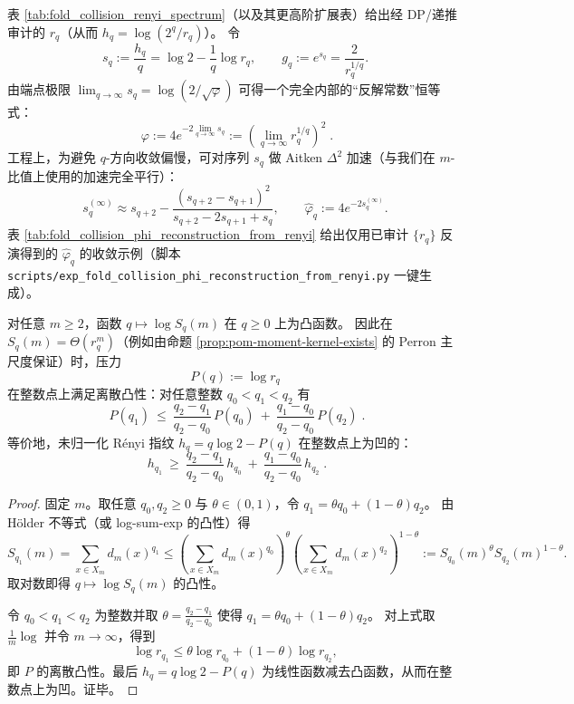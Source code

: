 \begin{remark}\label{rem:pom-recover-phi-from-collision-spectrum}
表 \ref{tab:fold_collision_renyi_spectrum}（以及其更高阶扩展表）给出经 DP/递推审计的 \(r_q\)（从而 \(h_q=\log(2^q/r_q)\)）。
令
\[
s_q:=\frac{h_q}{q}=\log 2-\frac{1}{q}\log r_q,
\qquad
g_q:=e^{s_q}=\frac{2}{r_q^{1/q}}.
\]
由端点极限 \(\lim_{q\to\infty}s_q=\log(2/\sqrt{\varphi})\) 可得一个完全内部的“反解常数”恒等式：
\[
\boxed{\;
\varphi
:=4e^{-2\lim_{q\to\infty}s_q}
:=\left(\lim_{q\to\infty}r_q^{1/q}\right)^2\; }.
\]
工程上，为避免 \(q\)-方向收敛偏慢，可对序列 \(s_q\) 做 Aitken \(\Delta^2\) 加速（与我们在 \(m\)-比值上使用的加速完全平行）：
\[
s_q^{(\infty)}
\approx
s_{q+2}-\frac{(s_{q+2}-s_{q+1})^2}{s_{q+2}-2s_{q+1}+s_q},
\qquad
\widehat\varphi_q:=4e^{-2s_q^{(\infty)}}.
\]
表 \ref{tab:fold_collision_phi_reconstruction_from_renyi} 给出仅用已审计 \(\{r_q\}\) 反演得到的 \(\widehat\varphi_q\) 的收敛示例（脚本 \texttt{scripts/exp\_fold\_collision\_phi\_reconstruction\_from\_renyi.py} 一键生成）。
\end{remark}



\begin{proposition}[压力的凸性与指纹的凹性]\label{prop:pom-pressure-convexity}
对任意 \(m\ge 2\)，函数 \(q\mapsto \log S_q(m)\) 在 \(q\ge 0\) 上为凸函数。
因此在 \(S_q(m)=\Theta(r_q^m)\)（例如由命题 \ref{prop:pom-moment-kernel-exists} 的 Perron 主尺度保证）时，压力
\[
P(q):=\log r_q
\]
在整数点上满足离散凸性：对任意整数 \(q_0<q_1<q_2\) 有
\[
\boxed{\;
P(q_1)\ \le\ \frac{q_2-q_1}{q_2-q_0}\,P(q_0)\ +\ \frac{q_1-q_0}{q_2-q_0}\,P(q_2)\; }.
\]
等价地，未归一化 Rényi 指纹 \(h_q=q\log 2-P(q)\) 在整数点上为凹的：
\[
\boxed{\;
h_{q_1}\ \ge\ \frac{q_2-q_1}{q_2-q_0}\,h_{q_0}\ +\ \frac{q_1-q_0}{q_2-q_0}\,h_{q_2}\; }.
\]
\end{proposition}
\begin{proof}
固定 \(m\)。取任意 \(q_0,q_2\ge 0\) 与 \(\theta\in(0,1)\)，令 \(q_1=\theta q_0+(1-\theta)q_2\)。
由 Hölder 不等式（或 log-sum-exp 的凸性）得
\[
S_{q_1}(m)=\sum_{x\in X_m}d_m(x)^{q_1}
\le
\left(\sum_{x\in X_m}d_m(x)^{q_0}\right)^{\theta}
\left(\sum_{x\in X_m}d_m(x)^{q_2}\right)^{1-\theta}
:=S_{q_0}(m)^{\theta}S_{q_2}(m)^{1-\theta}.
\]
取对数即得 \(q\mapsto \log S_q(m)\) 的凸性。
\par
令 \(q_0<q_1<q_2\) 为整数并取
\(
\theta=\frac{q_2-q_1}{q_2-q_0}
\)
使得 \(q_1=\theta q_0+(1-\theta)q_2\)。
对上式取 \(\frac{1}{m}\log\) 并令 \(m\to\infty\)，得到
\[
\log r_{q_1}\le \theta\log r_{q_0}+(1-\theta)\log r_{q_2},
\]
即 \(P\) 的离散凸性。最后 \(h_q=q\log 2-P(q)\) 为线性函数减去凸函数，从而在整数点上为凹。证毕。
\end{proof}

